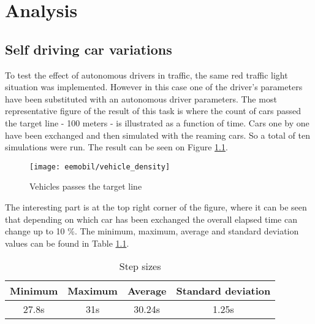 \chapter{Analysis}
	\section{Self driving car variations}
		To test the effect of autonomous drivers in traffic, the same red traffic light situation was implemented. However in this case one of the driver's parameters have been substituted with an autonomous driver parameters. The most representative figure of the result of this task is where the count of cars passed the target line - 100 meters - is illustrated as a function of time. Cars one by one have been exchanged and then simulated with the reaming cars. So a total of ten simulations were run. The result can be seen on Figure \ref{fig:vehicle_density}.
		\begin{figure}[ht]
			\centering
			\texttt{[image: eemobil/vehicle\_density]}
			\caption{Vehicles passes the target line}
			\label{fig:vehicle_density}
		\end{figure}

		The interesting part is at the top right corner of the figure, where it can be seen that depending on which car has been exchanged the overall elapsed time can change up to 10 \%. The minimum, maximum, average and standard deviation values can be found in Table \ref{tab:vehicle_density_minmaxavg}.
		\begin{table}[ht]
			\begin{center}
				\begin{tabular}{ |c|c|c|c|}
					\hline
					Minimum& Maximum & Average& Standard deviation\\
					\hline
					27.8s&31s&30.24s&1.25s\\
					\hline
				\end{tabular}
			\end{center}
			\caption{Step sizes}
			\label{tab:vehicle_density_minmaxavg}
		\end{table}
		
